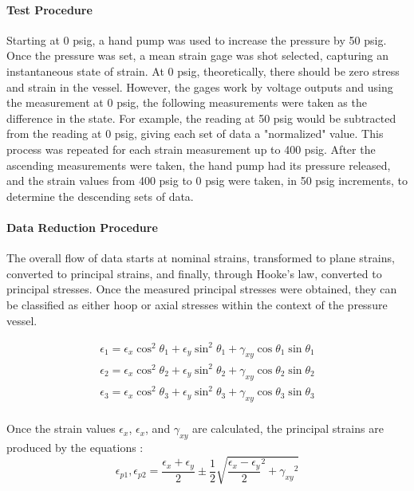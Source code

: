 \documentclass{article}
\begin{document}


\paragraph{Test Procedure}
Starting at 0 psig, a hand pump was used to increase the pressure by 50 psig. Once the pressure was set, a mean strain gage was shot selected, capturing an instantaneous state of strain. At 0 psig, theoretically, there should
be zero stress and strain in the vessel. However, the gages work by voltage outputs and using the measurement
at 0 psig, the following measurements were taken as the difference in the state. For example, the reading 
at 50 psig would be subtracted from the reading at 0 psig, giving each set of data a "normalized" value. This process
was repeated for each strain measurement up to 400 psig. After the ascending measurements were taken, the 
hand pump had its pressure released, and the strain values from 400 psig to 0 psig were taken, in 50 psig 
increments, to determine the descending sets of data. 


\paragraph {Data Reduction Procedure }
The overall flow of data starts at nominal strains, transformed to plane strains, converted  to
principal strains, and finally, through Hooke's law, converted to principal stresses. Once the measured 
principal stresses were obtained, they can be classified as either hoop or axial stresses within the 
context of the pressure vessel.

\begin{align}
\epsilon_1 = \epsilon_x\cos^{2}\theta_1 + \epsilon_y\sin^{2}\theta_1 + \gamma_{xy}\cos{\theta_1}\sin{\theta_1} \\
\epsilon_2 = \epsilon_x\cos^{2}\theta_2 + \epsilon_y\sin^{2}\theta_2 + \gamma_{xy}\cos{\theta_2}\sin{\theta_2} \\
\epsilon_3 = \epsilon_x\cos^{2}\theta_3 + \epsilon_y\sin^{2}\theta_3 + \gamma_{xy}\cos{\theta_3}\sin{\theta_3} \\
\end{align}

Once the strain values $\epsilon_x$, $\epsilon_x$, and $\gamma_{xy}$ are calculated, the principal strains
are produced by the equations :
$$ \epsilon_{p1}, \epsilon_{p2} = \frac{\epsilon_x + \epsilon_y}{2} \pm
 \frac{1}{2} \sqrt{ { \frac{\epsilon_x - \epsilon_y}{2}}^2 + {\gamma_{xy}}^2 } $$
\end{document}

